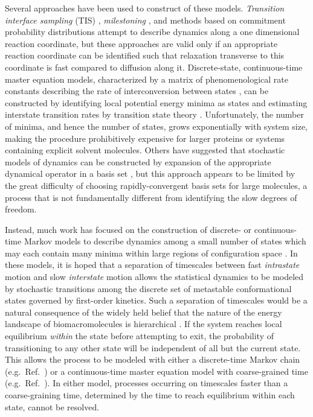 Several approaches have been used to construct of these models.
\emph{Transition interface sampling} (TIS) \cite{moroni:2004b}, \emph{milestoning} \cite{faradjian:2004a}, and methods based on commitment probability distributions \cite{rhee:2005a,berezhkovskii:2005a} attempt to describe dynamics along a one dimensional reaction coordinate, but these approaches are valid only if an appropriate reaction coordinate can be identified such that relaxation transverse to this coordinate is fast compared to diffusion along it.
Discrete-state, continuous-time master equation models, characterized by a matrix of phenomenological rate constants describing the rate of interconversion between states \cite{vankampen}, can be constructed by identifying local potential energy minima as states and estimating interstate transition rates by transition state theory \cite{czerminski:1990a,kunz:1995a,ball:1998b,levy:2001a,mortenson:2001a,mortenson:2002a,evans:2004a}.
Unfortunately, the number of minima, and hence the number of states, grows exponentially with system size, making the procedure prohibitively expensive for larger proteins or systems containing explicit solvent molecules.
Others have suggested that stochastic models of dynamics can be constructed by expansion of the appropriate dynamical operator in a basis set \cite{shalloway:1996a,ulitsky:1998a,shen:2003a}, but this approach appears to be limited by the great difficulty of choosing rapidly-convergent basis sets for large molecules, a process that is not fundamentally different from identifying the slow degrees of freedom.

Instead, much work has focused on the construction of discrete- or continuous-time Markov models to describe dynamics among a small number of states which may each contain many minima within large regions of configuration space \cite{grubmueller:1994a,degroot:2001a,swope:2004b,singhal:2004a,levy:2005a,sorin:2005b,sriraman:2005a,schultheis:2005a,singhal:2005a,elmer:2005b,park:2006a}.
In these models, it is hoped that a separation of timescales between fast \emph{intrastate} motion and slow \emph{interstate} motion allows the statistical dynamics to be modeled by stochastic transitions among the discrete set of metastable conformational states governed by first-order kinetics.
Such a separation of timescales would be a natural consequence of the widely held belief that the nature of the energy landscape of biomacromolecules is hierarchical \cite{ansari:1985a,bai:1989a,becker:1997a,levy:2001a,levy:2002a}.
If the system reaches local equilibrium \emph{within} the state before attempting to exit, the probability of transitioning to any other state will be independent of all but the current state.
This allows the process to be modeled with either a discrete-time Markov chain (e.g.\ Ref.\ \cite{singhal:2004a}) or a continuous-time master equation model with coarse-grained time (e.g.\ Ref.\ \cite{sriraman:2005a}).
In either model, processes occurring on timescales faster than a coarse-graining time, determined by the time to reach equilibrium within each state, cannot be resolved.

